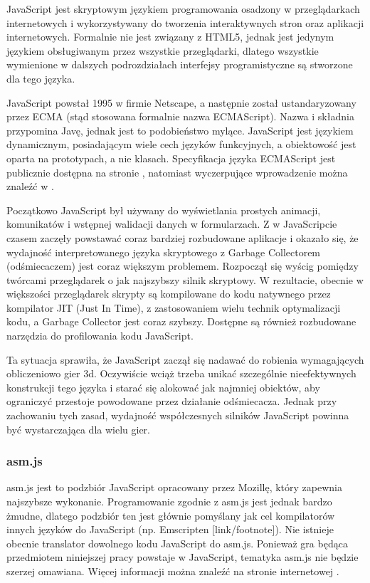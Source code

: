 JavaScript jest skryptowym językiem programowania osadzony w przeglądarkach internetowych
i wykorzystywany do tworzenia interaktywnych stron oraz aplikacji internetowych.
Formalnie nie jest związany z HTML5, jednak jest jedynym językiem obsługiwanym przez
wszystkie przeglądarki, dlatego wszystkie wymienione w dalszych podrozdziałach
interfejsy programistyczne są stworzone dla tego języka.

JavaScript powstał 1995 w firmie Netscape, a następnie został ustandaryzowany przez ECMA (stąd
stosowana formalnie nazwa ECMAScript). Nazwa i składnia przypomina Javę, jednak jest to podobieństwo
mylące. JavaScript jest językiem dynamicznym, posiadającym wiele cech języków funkcyjnych,
a obiektowość jest oparta na prototypach, a nie klasach. Specyfikacja języka ECMAScript jest
publicznie dostępna na stronie \cite{ecma-spec}, natomiast wyczerpujące wprowadzenie można
znaleźć w \cite{js-definitive}.

Początkowo JavaScript był używany do wyświetlania prostych animacji,
komunikatów i wstępnej walidacji danych w formularzach. Z w JavaScripcie czasem zaczęły
powstawać coraz bardziej rozbudowane aplikacje i okazało się, że wydajność interpretowanego
języka skryptowego z Garbage Collectorem (odśmiecaczem) jest coraz większym problemem.
Rozpoczął się wyścig pomiędzy twórcami
przeglądarek o jak najszybszy silnik skryptowy. W rezultacie, obecnie w większości przeglądarek
skrypty są kompilowane do kodu natywnego przez kompilator JIT (Just In Time), z zastosowaniem wielu
technik optymalizacji kodu, a Garbage Collector jest coraz szybszy. Dostępne są również
rozbudowane narzędzia do profilowania kodu JavaScript.

Ta sytuacja sprawiła, że JavaScript zaczął się nadawać do robienia wymagających obliczeniowo
gier 3d. Oczywiście wciąż trzeba unikać szczególnie nieefektywnych konstrukcji tego języka
i starać się alokować jak najmniej obiektów, aby ograniczyć przestoje powodowane przez działanie
odśmiecacza. Jednak przy zachowaniu tych zasad, wydajność współczesnych silników JavaScript
powinna być wystarczająca dla wielu gier.


\subsubsection{asm.js}
\label{sec:asmjs}

asm.js jest to podzbiór JavaScript opracowany przez Mozillę, który zapewnia najszybsze wykonanie.
Programowanie zgodnie z asm.js jest jednak bardzo żmudne, dlatego podzbiór ten jest głównie
pomyślany jak cel kompilatorów innych języków do JavaScript (np. Emscripten [link/footnote]). Nie istnieje
obecnie translator dowolnego kodu JavaScript do asm.js. Ponieważ gra będąca przedmiotem niniejszej
pracy powstaje w JavaScript, tematyka asm.js nie będzie szerzej omawiana. Więcej informacji można
znaleźć na stronie internetowej \cite{asm-js}.

